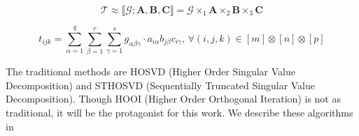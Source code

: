     \begin{equation} \label{eq:tucker_ttm}
        \mathcal{T} \approx \llbracket \mathcal{G}; \mathbf{A,B,C} \rrbracket = \mathcal{G} \times_1 \mathbf{A} \times_2 \mathbf{B} \times_3 \mathbf{C}
    \end{equation}
    
    \begin{equation} \label{eq:tucker_element}
        t_{ijk} = \sum_{\alpha = 1}^{q} \sum_{\beta = 1}^{r} \sum_{\gamma = 1}^{s} g_{\alpha \beta \gamma}\cdot a_{i\alpha}b_{j\beta}c_{i\gamma}\text{, }\forall (i, j, k) \in [m]\otimes[n]\otimes[p]
    \end{equation}
    
    
    The traditional methods are HOSVD (Higher Order Singular Value
    Decomposition) and STHOSVD (Sequentially Truncated Singular Value
    Decomposition). Though HOOI (Higher Order Orthogonal Iteration) is not as
    traditional, it will be the protagonist for this work. We describe these
    algorithms in 
